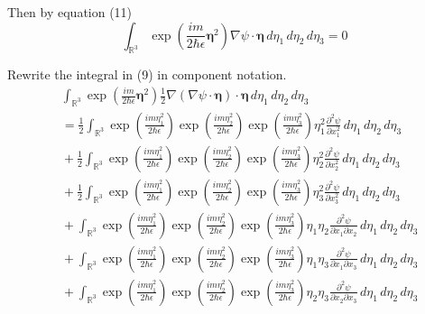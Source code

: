 \documentclass[12pt]{article}
\begin{document}
Then by equation (11)
\begin{equation*}
\int_{\mathbb R^3}
\exp\left(\frac{im}{2\hbar\epsilon}\boldsymbol\eta^2\right)
\nabla\psi\cdot\boldsymbol\eta
\,d\eta_1\,d\eta_2\,d\eta_3=0
\tag{14}
\end{equation*}

Rewrite the integral in (9) in component notation.
\begin{align*}
&\int_{\mathbb R^3}
\exp\left(\frac{im}{2\hbar\epsilon}\boldsymbol\eta^2\right)
\tfrac{1}{2}
\nabla(\nabla\psi\cdot\boldsymbol\eta)\cdot\boldsymbol\eta
\,d\eta_1\,d\eta_2\,d\eta_3
\\
&{}=\frac{1}{2}\int_{\mathbb R^3}
\exp\left(\frac{im\eta_1^2}{2\hbar\epsilon}\right)
\exp\left(\frac{im\eta_2^2}{2\hbar\epsilon}\right)
\exp\left(\frac{im\eta_3^2}{2\hbar\epsilon}\right)
\eta_1^2\frac{\partial^2\psi}{\partial x_1^2}
\,d\eta_1\,d\eta_2\,d\eta_3
\\
&{}+\frac{1}{2}\int_{\mathbb R^3}
\exp\left(\frac{im\eta_1^2}{2\hbar\epsilon}\right)
\exp\left(\frac{im\eta_2^2}{2\hbar\epsilon}\right)
\exp\left(\frac{im\eta_3^2}{2\hbar\epsilon}\right)
\eta_2^2\frac{\partial^2\psi}{\partial x_2^2}
\,d\eta_1\,d\eta_2\,d\eta_3
\\
&{}+\frac{1}{2}\int_{\mathbb R^3}
\exp\left(\frac{im\eta_1^2}{2\hbar\epsilon}\right)
\exp\left(\frac{im\eta_2^2}{2\hbar\epsilon}\right)
\exp\left(\frac{im\eta_3^2}{2\hbar\epsilon}\right)
\eta_3^2\frac{\partial^2\psi}{\partial x_3^2}
\,d\eta_1\,d\eta_2\,d\eta_3
\\
&{}+\int_{\mathbb R^3}
\exp\left(\frac{im\eta_1^2}{2\hbar\epsilon}\right)
\exp\left(\frac{im\eta_2^2}{2\hbar\epsilon}\right)
\exp\left(\frac{im\eta_3^2}{2\hbar\epsilon}\right)
\eta_1\eta_2\frac{\partial^2\psi}{\partial x_1\partial x_2}
\,d\eta_1\,d\eta_2\,d\eta_3
\\
&{}+\int_{\mathbb R^3}
\exp\left(\frac{im\eta_1^2}{2\hbar\epsilon}\right)
\exp\left(\frac{im\eta_2^2}{2\hbar\epsilon}\right)
\exp\left(\frac{im\eta_3^2}{2\hbar\epsilon}\right)
\eta_1\eta_3\frac{\partial^2\psi}{\partial x_1\partial x_3}
\,d\eta_1\,d\eta_2\,d\eta_3
\\
&{}+\int_{\mathbb R^3}
\exp\left(\frac{im\eta_1^2}{2\hbar\epsilon}\right)
\exp\left(\frac{im\eta_2^2}{2\hbar\epsilon}\right)
\exp\left(\frac{im\eta_3^2}{2\hbar\epsilon}\right)
\eta_2\eta_3\frac{\partial^2\psi}{\partial x_2\partial x_3}
\,d\eta_1\,d\eta_2\,d\eta_3
\end{align*}
\end{document}
